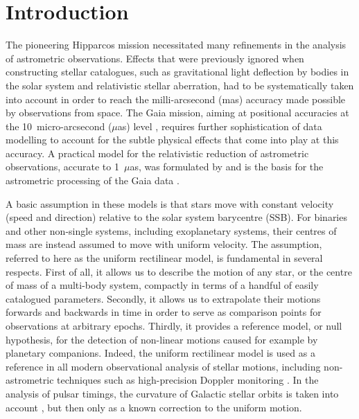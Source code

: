\documentclass{aa}
\begin{document}

\maketitle

\section{Introduction}

The pioneering Hipparcos mission necessitated many refinements in the
analysis of astrometric observations. Effects that were previously ignored when constructing
stellar catalogues, such as gravitational light deflection by bodies in the solar system and
relativistic stellar aberration, had to be systematically taken into account in order to reach
the milli-arcsecond (mas) accuracy made possible by observations from space. The Gaia mission,
aiming at positional accuracies at the 10~micro-arcsecond ($\mu$as) level \citep{deBruijne2012},
requires further sophistication of data modelling to account for the subtle physical effects that
come into play at this accuracy. A practical model for the relativistic reduction of astrometric
observations, accurate to 1~$\mu$as, was formulated by \citet{klioner2003} and is the basis
for the astrometric processing of the Gaia data \citep{lindegrenAGIS2012}.

A basic assumption in these models is that stars move with constant velocity (speed and
direction) relative to the solar system barycentre (SSB). For binaries and other non-single systems,
including exoplanetary systems, their centres of mass are instead assumed to move with
uniform velocity. The assumption, referred to here as the uniform rectilinear model,
is fundamental in several respects. First of all, it allows us to describe the motion
of any star, or the centre of mass of a multi-body system, compactly in terms of a handful of
easily catalogued parameters. Secondly, it allows us to extrapolate their motions forwards and backwards
in time in order to serve as comparison points for observations at arbitrary epochs. Thirdly, it provides
a reference model, or null hypothesis, for the detection of non-linear motions caused for example
by planetary companions. Indeed, the uniform rectilinear model is used as a reference in all modern
observational analysis of stellar motions, including non-astrometric techniques such as
high-precision Doppler monitoring \citep[e.g.][]{choi+2013}. In the analysis of pulsar timings,
the curvature of Galactic stellar orbits is taken into account \citep{edwards+2006}, but then
only as a known correction to the uniform motion.
\end{document}
